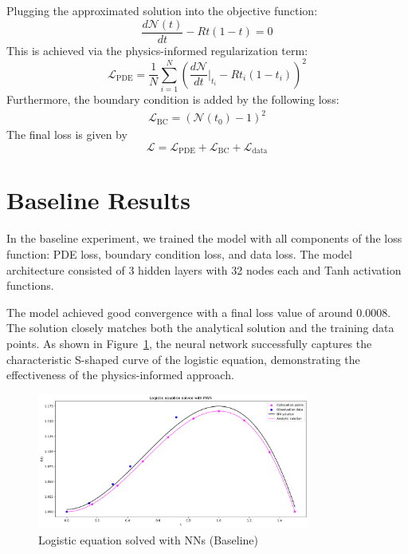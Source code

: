 \documentclass[11pt,a4paper]{article}
\begin{document}
Plugging the approximated solution into the objective function: 
\begin{equation}
    \frac{d\mathcal{N}(t)}{dt} - Rt(1-t) = 0
\end{equation}
This is achieved via the physics-informed regularization term:
\begin{equation}
    \mathcal{L}_\mathrm{PDE} = \frac{1}{N} \sum_{i=1}^N \left( \frac{d\mathcal{N}}{dt} \bigg\rvert_{t_i} - R t_i (1-t_i) \right)^2 
\end{equation}
Furthermore, the boundary condition is added by the following loss: 
\begin{eqnarray}
    \mathcal{L}_\mathrm{BC} = \left( \mathcal{N}(t_0) - 1 \right)^2
\end{eqnarray}
The final loss is given by
$$ \mathcal{L} = \mathcal{L}_\mathrm{PDE} + \mathcal{L}_\mathrm{BC} + \mathcal{L}_\mathrm{data} $$

\section{Baseline Results}
In the baseline experiment, we trained the model with all components of the loss function: PDE loss, boundary condition loss, and data loss. The model architecture consisted of 3 hidden layers with 32 nodes each and Tanh activation functions.

The model achieved good convergence with a final loss value of around 0.0008. The solution closely matches both the analytical solution and the training data points. As shown in Figure~\ref{fig:baseline}, the neural network successfully captures the characteristic S-shaped curve of the logistic equation, demonstrating the effectiveness of the physics-informed approach.

\begin{figure}[h]
    \centering
\includegraphics[width=0.8\textwidth]{figures/pinn_benchmark.png}
    \caption{Logistic equation solved with NNs (Baseline)}
    \label{fig:baseline}
\end{figure}
\end{document}
